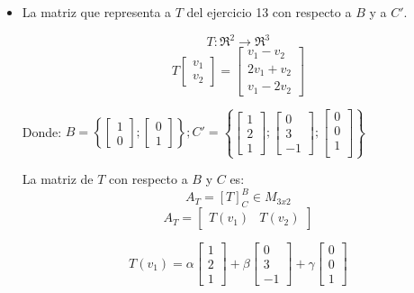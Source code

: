 \documentclass[12pt]{article}
\begin{document}
\begin{itemize}
    \item La matriz que representa a $T$ del ejercicio 13 con respecto a $B$ y a $C'$.
    
        \[T: \Re^2 \rightarrow \Re^3\]
        \[T\left[\begin{array}{c}
            v_{1}\\
            v_{2}
            \end{array}\right]=\left[\begin{array}{c}
            v_{1}-v_{2}\\
            2v_{1}+v_{2}\\
            v_{1}-2v_{2}
        \end{array}\right]\]
    
    Donde: $B=\left\{ \left[\begin{array}{c}
            1\\
            0
            \end{array}\right];\left[\begin{array}{c}
            0\\
            1
            \end{array}\right]\right\} ;C'=\left\{ \left[\begin{array}{c}
            1\\
            2\\
            1
            \end{array}\right];\left[\begin{array}{c}
            0\\
            3\\
            -1
            \end{array}\right];\left[\begin{array}{c}
            0\\
            0\\
            1\\
        \end{array}\right]\right\} $
        
    La matriz de $T$ con respecto a $B$ y $C$ es:
        \[A_T = [T]_C^B \in M_{3x2} \]
        \[A_T = \left[\begin{array}{cc}
             T(v_1) &  T(v_2) 
        \end{array}\right]\]
    
    
    $$T(v_{1})=\alpha\left[\begin{array}{c}
    1\\
    2\\
    1
    \end{array}\right]+\beta\left[\begin{array}{c}
    0\\
    3\\
    -1
    \end{array}\right]+\gamma\left[\begin{array}{c}
    0\\
    0\\
    1
    \end{array}\right]$$
    

\end{itemize}
\end{document}
